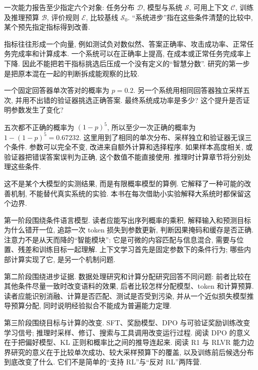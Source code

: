 \begin{definition}
一次能力报告至少指定六个对象: 任务分布 $\mathcal D$, 模型与系统 $\mathcal S$, 可用上下文 $\mathcal C$, 训练及推理预算 $\mathcal B$, 评价规则 $\mathcal E$, 比较基线 $\mathcal S_0$. “系统进步”指在这些条件清楚的比较中, 某个预先指定指标得到改善.
\end{definition}
指标往往形成一个向量, 例如测试负对数似然、答案正确率、攻击成功率、正常任务完成率和计算成本. 一个系统可以在正确率上提高, 在成本或正常任务完成率上下降. 因此不能把若干指标挑选后压成一个没有定义的“智慧分数”. 研究的第一步是把原本混在一起的判断拆成能观察的比较.

\begin{example}
一个固定回答器单次答对的概率为 $p=0.2$. 另一个系统用相同回答器独立采样五次, 并用不出错的验证器挑选正确答案. 最终系统成功率是多少? 这个提升是否证明参数发生了变化?
\end{example}
\begin{solution}
五次都不正确的概率为 $(1-p)^5$, 所以至少一次正确的概率为 $1-(1-p)^5=0.67232$. 这里用到了相同的单次分布、采样独立和验证器无误三个条件. 参数可以完全不变, 改进来自额外计算和选择程序. 如果样本高度相关, 或验证器把错误答案误判为正确, 这个数值不能直接使用. 推理时计算章节将分别处理这些条件.
\end{solution}
这不是某个大模型的实测结果, 而是有限概率模型的算例. 它解释了一种可能的改善机制, 不能替代真实系统的实验. 本书在每次借助小实验解释大系统时都保留这个边界.

第一阶段围绕条件语言模型. 读者应能写出序列概率的乘积, 解释输入和预测目标为什么错开一位, 追踪一次 token 损失到参数更新, 判断因果掩码和缓存是否正确. 注意力不是从天而降的“智能模块”: 它是可微的内容匹配与信息混合, 需要与位置、残差和训练目标一起理解. 上下文学习首先是固定参数下的条件行为; 哪些内部计算实现了它, 是另一个机制问题.

第二阶段围绕进步证据. 数据处理研究和计算分配研究回答不同问题: 前者比较在其他条件尽量一致时改变语料的效果, 后者比较怎样分配模型、token 和计算预算. 读者应能识别消融、计算是否匹配、测试是否受到污染, 并从一个近似损失模型推导预算分配, 同时说明经验拟合不能成为普遍能力定理\cite{fineweb,chinchilla}.

第三阶段围绕目标与计算的改变. SFT、奖励模型、DPO 与可验证奖励训练改变学习信号; 推理时采样、修订、搜索与工具调用改变运行过程. 阅读 DPO 的意义在于把偏好模型、KL 正则和概率比之间的推导连起来. 阅读 R1 与 RLVR 能力边界研究的意义在于比较单次成功、较大采样预算下的覆盖, 以及训练前后候选分布到底改变了什么. 它们不是简单的“支持 RL”与“反对 RL”两阵营\cite{dpo,r1nature,rlvrboundary,testcompute}.

